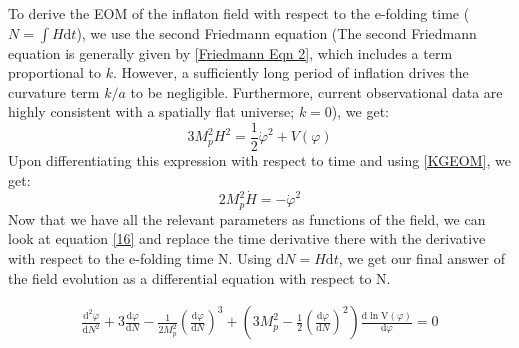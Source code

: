 \documentclass[aps,prd,reprint,preprintnumbers,showpacs,floatfix,nofootinbib,superscript address]{revtex4-2}
\begin{document}
 To derive the EOM of the inflaton field with respect to the e-folding time ($N = \int H \text{d}t$), we use the second Friedmann equation (The second Friedmann equation is generally given by \ref{Friedmann Eqn 2}, which includes a term proportional to $k$. However, a sufficiently long period of inflation drives the curvature term $k/a$ to be negligible. Furthermore, current observational data are highly consistent with a spatially flat universe; $k=0$), we get:
\begin{equation}    \label{Friedmann 3}
    3 M_p^2H^2 = \frac{1}{2} \dot{\varphi}^2 + V(\varphi)
\end{equation}
Upon differentiating this expression with respect to time and using \ref{KGEOM}, we get:
\begin{equation} \label{H vs phi}
    2 M_p^2 \dot{H} = -   \dot{\varphi}^2
\end{equation}
Now that we have all the relevant parameters as functions of the field, we can look at equation \ref{16} and replace the time derivative there with the derivative with respect to the e-folding time N. Using $\text{d}N = H \text{d}t$, we get our final answer of the field evolution as a differential equation with respect to N.
\begin{widetext}
\begin{subequations}
\begin{align}\label{phi vs N}
    \frac{\text{d}^2\varphi}{\text{d}N^2} +3 \frac{\text{d}\varphi}{\text{d}N}  - \frac{1}{2M_p^2} \left(\frac{\text{d}\varphi}{\text{d}N} \right)^3   +  \left( 3 M_p^2 - \frac{1}{2} \left(\frac{\text{d}\varphi}{\text{d}N} \right)^2 \right) \frac{\text{d}\ln \text{V}(\varphi)}{\text{d} \varphi} = 0    
\end{align}
\end{subequations}
\end{widetext}
\end{document}
